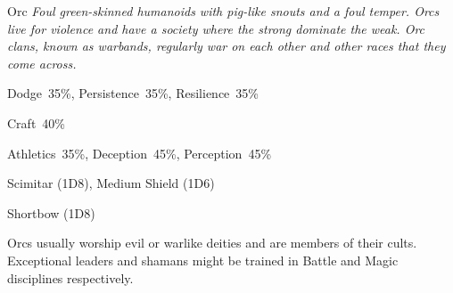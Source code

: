 \begin{monsterbox}{Orc}
	\textit{Foul green-skinned humanoids with pig-like snouts and a foul temper. Orcs live for violence and have a society where the strong dominate the weak. Orc clans, known as warbands, regularly war on each other and other races that they come across.}\\
	\rpghline
	\basics[%
        hitpoints  = 11, %
	majorwound = 6,
	damagemodifier = 0,
	powerpoints = 10,
	movementrate = 15m,
	armor = Leather (2AP),
	plunderrating = 2
	]
	\rpghline%
	\stats[ %
		STR = 4D6 (14),
		CON = 3D6 (11),
		DEX = 4D6 (14),
		SIZ = 2D6+3 (10),
		INT = 3D6   (11),
		POW = 2D6+3 (10),
		CHA = 2D6   (7)
	]
	\rpghline%
	\begin{rpg-monsteraction}[Resistances]
		Dodge~35\%, Persistence~35\%, Resilience~35\%
	\end{rpg-monsteraction}
	\begin{rpg-monsteraction}[Knowledge]
    		Craft~40\%
	\end{rpg-monsteraction}
	\begin{rpg-monsteraction}[Practical]
		Athletics~35\%, Deception~45\%, Perception~45\%
	\end{rpg-monsteraction}
	\begin{rpg-monsteraction}
		Scimitar (1D8), Medium Shield (1D6)
	\end{rpg-monsteraction}
	\begin{rpg-monsteraction}
		Shortbow (1D8)
	\end{rpg-monsteraction}
	\begin{rpg-monsteraction}[Supernatural]
		Orcs usually worship evil or warlike deities and are members of their cults. Exceptional leaders and shamans might be trained in Battle and Magic disciplines respectively.
	\end{rpg-monsteraction}

\end{monsterbox}


